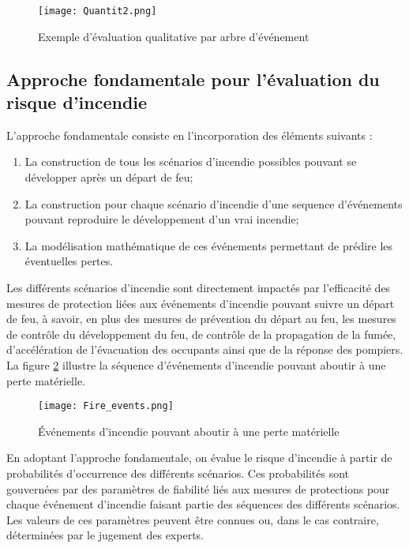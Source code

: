 \documentclass[11pt]{article}
\begin{document}
\begin{figure}
\begin{center}
\texttt{[image: Quantit2.png]}
\end{center}
\caption{Exemple d'évaluation qualitative par arbre d'événement}
\label{Quantit2}
\end{figure}

\subsection{Approche fondamentale pour l'évaluation du risque d'incendie}

L'approche fondamentale consiste en l'incorporation des éléments suivants :
\begin{enumerate}
\item La construction de tous les scénarios d'incendie possibles pouvant se développer après un départ de feu;
\item La construction pour chaque scénario d'incendie d'une sequence d'événements pouvant reproduire le développement d'un vrai incendie;
\item La modélisation mathématique de ces événements permettant de prédire les éventuelles pertes. 
\end{enumerate}

Les différents scénarios d'incendie sont directement impactés par l'efficacité des mesures de protection liées aux événements d'incendie pouvant suivre un départ de feu, à savoir, en plus des mesures de prévention du départ au feu, les mesures de contrôle du développement du feu, de contrôle de la propagation de la fumée, d'accélération de l'évacuation des occupants ainsi que de la réponse des pompiers. La figure \ref{Fire_events} illustre la séquence d'événements d'incendie pouvant aboutir à une perte matérielle.

\begin{figure}
\begin{center}
\texttt{[image: Fire\_events.png]}
\end{center}
\caption{Événements d'incendie pouvant aboutir à une perte matérielle}\label{Fire_events}
\end{figure}

En adoptant l'approche fondamentale, on évalue le risque d'incendie à partir de probabilités d'occurrence des différents scénarios. Ces probabilités sont gouvernées par des paramètres de fiabilité liés aux mesures de protections pour chaque événement d'incendie faisant partie des séquences des différents scénarios. Les valeurs de ces paramètres peuvent être connues ou, dans le cas contraire, déterminées par le jugement des experts.
\end{document}
